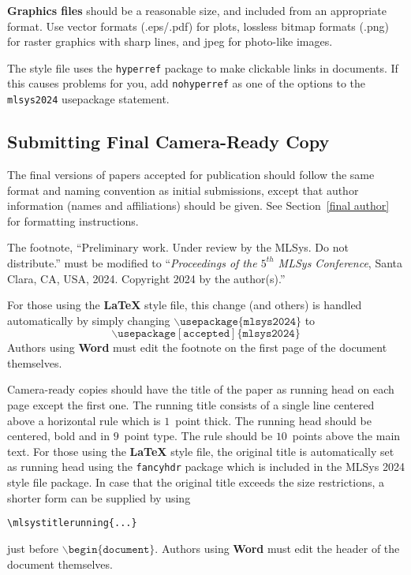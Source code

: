 \documentclass{article}
\begin{document}
\textbf{Graphics files} should be a reasonable size, and included from
an appropriate format. Use vector formats (.eps/.pdf) for plots,
lossless bitmap formats (.png) for raster graphics with sharp lines, and
jpeg for photo-like images.

The style file uses the \texttt{hyperref} package to make clickable
links in documents. If this causes problems for you, add
\texttt{nohyperref} as one of the options to the \texttt{mlsys2024}
usepackage statement.


\subsection{Submitting Final Camera-Ready Copy}

The final versions of papers accepted for publication should follow the
same format and naming convention as initial submissions, except that
author information (names and affiliations) should be given. See
Section~\ref{final author} for formatting instructions.

The footnote, ``Preliminary work. Under review by the MLSys. Do not distribute.''
must be modified to ``\textit{Proceedings of the
$\mathit{5}^{th}$ MLSys Conference},
Santa Clara, CA, USA, 2024.
Copyright 2024 by the author(s).''

For those using the \textbf{\LaTeX} style file, this change (and others) is
handled automatically by simply changing
$\mathtt{\backslash usepackage\{mlsys2024\}}$ to
$$\mathtt{\backslash usepackage[accepted]\{mlsys2024\}}$$
Authors using \textbf{Word} must edit the
footnote on the first page of the document themselves.

Camera-ready copies should have the title of the paper as running head
on each page except the first one. The running title consists of a
single line centered above a horizontal rule which is $1$~point thick.
The running head should be centered, bold and in $9$~point type. The
rule should be $10$~points above the main text. For those using the
\textbf{\LaTeX} style file, the original title is automatically set as running
head using the \texttt{fancyhdr} package which is included in the MLSys
2024 style file package. In case that the original title exceeds the
size restrictions, a shorter form can be supplied by using

\verb|\mlsystitlerunning{...}|

just before $\mathtt{\backslash begin\{document\}}$.
Authors using \textbf{Word} must edit the header of the document themselves.
\end{document}
